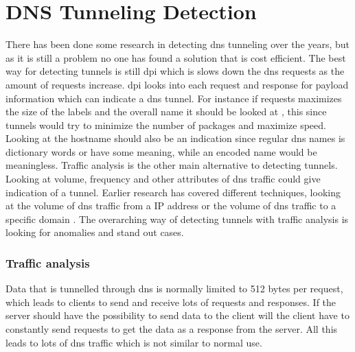 \chapter{DNS Tunneling Detection}
\label{chp:dns_detection}

There has been done some research in detecting \Gls{dns} tunneling over the years, but as it is still a problem no one has found a solution that is cost efficient. The best way for detecting tunnels is still \Gls{dpi} which is slows down the \Gls{dns} requests as the amount of requests increase. \Gls{dpi} looks into each request and response for payload information which can indicate a \Gls{dns} tunnel. For instance if requests maximizes the size of the labels and the overall name it should be looked at \cite{farnham2013detecting}, this since tunnels would try to minimize the number of packages and maximize speed. Looking at the hostname should also be an indication since regular \Gls{dns} names is dictionary words or have some meaning, while an encoded name would be meaningless. Traffic analysis is the other main alternative to detecting tunnels. Looking at volume, frequency and other attributes of \Gls{dns} traffic could give indication of a tunnel. Earlier research has covered different techniques, looking at the volume of \Gls{dns} traffic from a IP address or the volume of \Gls{dns} traffic to a specific domain \cite{farnham2013detecting}. The overarching way of detecting tunnels with traffic analysis is looking for anomalies and stand out cases.

\subsection{Traffic analysis}
Data that is tunnelled through \Gls{dns} is normally limited to 512 bytes per request, which leads to clients to send and receive lots of requests and responses. If the server should have the possibility to send data to the client will the client have to constantly send requests to get the data as a response from the server. All this leads to lots of \Gls{dns} traffic which is not similar to normal use.
